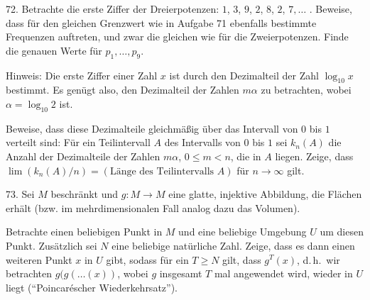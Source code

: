 \begin{problem}{72.}
	Betrachte die erste Ziffer der Dreierpotenzen: $1$,
	$3$, $9$, $2$, $8$, $2$, $7, \dots$ . Beweise, dass für den gleichen Grenzwert wie in Aufgabe 71 ebenfalls bestimmte Frequenzen auftreten, und zwar die gleichen wie für die Zweierpotenzen. Finde die genauen Werte für $p_1, \dots, p_9$.
	\begin{note}{Hinweis:}
		Die erste Ziffer einer Zahl $x$ ist durch den Dezimalteil der Zahl $\log_{10} x$ bestimmt. Es genügt also, den Dezimalteil der Zahlen $m \alpha$ zu betrachten, wobei $\alpha=\log_{10} 2$ ist.
	\end{note}
	Beweise, dass diese Dezimalteile gleichmäßig über das Intervall von $0$ bis $1$ verteilt sind: Für ein Teilintervall $A$ des Intervalls von $0$ bis $1$ sei $k_n(A)$ die Anzahl der Dezimalteile der Zahlen $m\alpha$, $0 \leqslant m < n$, die in $A$ liegen. Zeige, dass $\lim(k_n(A)/n)=(\text{Länge des Teilintervalls $A$})$ für $n\rightarrow \infty$ gilt.
\end{problem}

\begin{problem}{73.}
	Sei $M$ beschränkt und $g\colon M \to M$ eine glatte, injektive Abbildung, die Flächen erhält (bzw. im mehrdimensionalen Fall analog dazu das Volumen). 
	 
	Betrachte einen beliebigen Punkt in $M$ und eine beliebige Umgebung $U$ um diesen Punkt. Zusätzlich sei $N$ eine beliebige natürliche Zahl. 
	Zeige, dass es dann einen weiteren Punkt $x$ in $U$ gibt, sodass für ein $T\geq N$ gilt, dass $g^T (x)$, d.\,h.\ wir betrachten $g(g(\dots (x))$, wobei $g$ insgesamt $T$ mal angewendet wird, wieder in $U$ liegt (\enquote{Poincaréscher Wiederkehrsatz}).
\end{problem}

